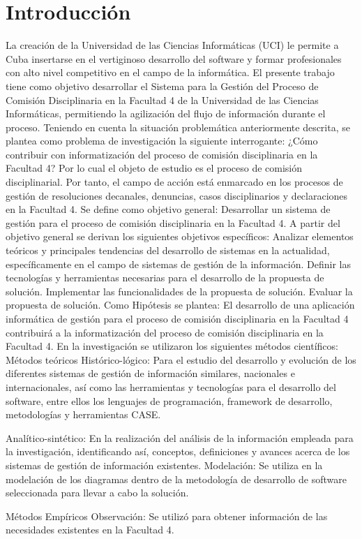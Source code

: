 \chapter*{Introducción}
La creación de la Universidad de las Ciencias Informáticas (UCI) le permite a Cuba insertarse en el vertiginoso desarrollo del software y formar profesionales con alto nivel competitivo en el campo de la informática. 
El presente trabajo tiene como objetivo desarrollar el Sistema para la Gestión del Proceso de Comisión Disciplinaria en la Facultad 4 de la Universidad de las Ciencias Informáticas, permitiendo la agilización del flujo de información durante el proceso. 
Teniendo en cuenta la situación problemática anteriormente descrita, se plantea como problema de investigación la siguiente interrogante: 
¿Cómo contribuir con informatización del proceso de comisión disciplinaria en la Facultad 4? 
Por lo cual el objeto de estudio es el proceso de comisión disciplinarial. 
Por tanto, el campo de acción está enmarcado en los procesos de gestión de resoluciones decanales, denuncias, casos disciplinarios y declaraciones en la Facultad 4. 
Se define como objetivo general: Desarrollar un sistema de gestión para el proceso de comisión disciplinaria en la Facultad 4. 
A partir del objetivo general se derivan los siguientes objetivos específicos: 
Analizar elementos teóricos y principales tendencias del desarrollo de sistemas en la actualidad, específicamente en el campo de sistemas de gestión de la información.
Definir las tecnologías y herramientas necesarias para el desarrollo de la propuesta de solución. 
Implementar las funcionalidades de la propuesta de solución. 
Evaluar la propuesta de solución. 
Como Hipótesis se plantea: El desarrollo de una aplicación informática de gestión para el proceso de comisión disciplinaria en la Facultad 4 contribuirá a la informatización del proceso de comisión disciplinaria en la Facultad 4. 
En la investigación se utilizaron los siguientes métodos científicos:
Métodos teóricos 
Histórico-lógico: Para el estudio del desarrollo y evolución de los diferentes sistemas de gestión de 
información similares, nacionales e internacionales, así como las herramientas y tecnologías para el desarrollo del software, entre ellos los lenguajes de programación, framework de desarrollo, metodologías y herramientas CASE.

Analítico-sintético: En la realización del análisis de la información empleada para la investigación, identificando así, conceptos, definiciones y avances acerca de los sistemas de gestión de información existentes. 
Modelación: Se utiliza en la modelación de los diagramas dentro de la metodología de desarrollo de software seleccionada para llevar a cabo la solución. 

Métodos Empíricos 
Observación: Se utilizó para obtener información de las necesidades existentes en la Facultad 4. 